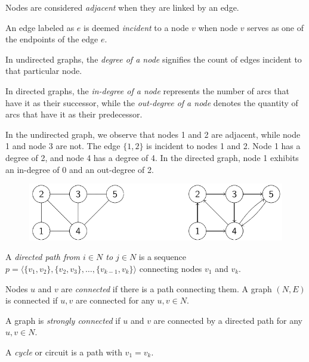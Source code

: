 \documentclass[12pt, a4paper]{report}
\begin{document}
    \newpage
    \begin{definition}
        Nodes are considered \emph{adjacent} when they are linked by an edge.
        
        An edge labeled as $e$ is deemed \emph{incident} to a node $v$ when node $v$ serves as one of the endpoints of the edge $e$.
        
        In undirected graphs, the \emph{degree of a node} signifies the count of edges incident to that particular node. 
        
        In directed graphs, the \emph{in-degree of a node} represents the number of arcs that have it as their successor, while the \emph{out-degree of a node} denotes the quantity of arcs that have it as their predecessor.
    \end{definition}
    \begin{example}
        In the undirected graph, we observe that nodes 1 and 2 are adjacent, while node 1 and node 3 are not. 
        The edge $\{1,2\}$ is incident to nodes 1 and 2. 
        Node 1 has a degree of 2, and node 4 has a degree of 4.
        In the directed graph, node 1 exhibits an in-degree of 0 and an out-degree of 2.
        \begin{figure}[H]
            \centering
            \includegraphics[width=0.75\linewidth]{images/graph.png}
        \end{figure}
    \end{example}
    \begin{definition}
        A \emph{directed path from $i \in N$ to $j \in N$} is a sequence $p=\langle \{v_1,v_2\},\{v_2,v_3\},\dots,\{v_{k-1},v_k\}\rangle $ connecting nodes $v_1$ and $v_k$.

        Nodes $u$ and $v$ are \emph{connected} if there is a path connecting them. 
        A graph $(N,E)$ is connected if $u,v$ are connected for any $u,v \in N$. 
        
        A graph is \emph{strongly connected} if $u$ and $v$ are connected by a directed path for any $u,v \in N$. 
        
        A \emph{cycle} or circuit is a path with $v_1=v_k$.
    \end{definition}
\end{document}

